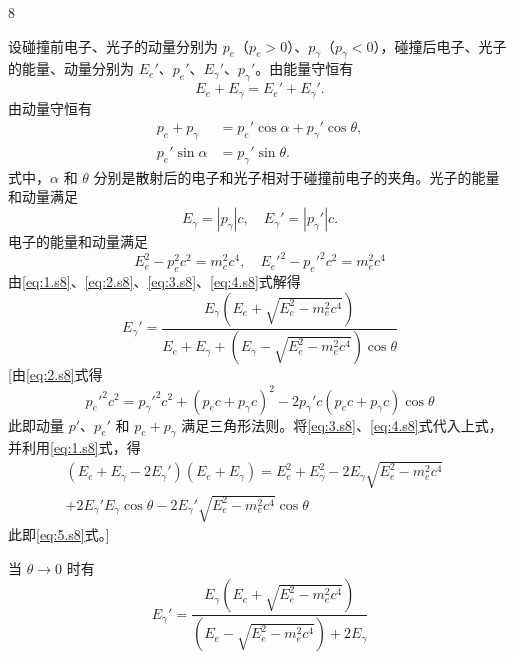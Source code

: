 \begin{solution}{8}
\begin{subsolution}
设碰撞前电子、光子的动量分别为 $p_e$（$p_e > 0$）、$p_\gamma$（$p_\gamma < 0$），碰撞后电子、光子的能量、动量分别为 $E_e'$、$p_e'$、$E_\gamma'$、$p_\gamma'$。由能量守恒有
\begin{equation}
E_e + E_\gamma = E_e' + E_\gamma'.
\label{eq:1.s8}
\end{equation}
由动量守恒有
\begin{equation}
\begin{aligned}
p_e + p_\gamma &= p_e' \cos \alpha + p_\gamma' \cos \theta, \nonumber\\
p_e' \sin \alpha &= p_\gamma' \sin \theta . 
\end{aligned}
\tag{1.8.2.s}
\label{eq:2.s8}
\end{equation}
式中，$\alpha$ 和 $\theta$ 分别是散射后的电子和光子相对于碰撞前电子的夹角。光子的能量和动量满足
\begin{equation}
E_\gamma = |p_\gamma| c, \quad E_\gamma' = |p_\gamma'| c.
\label{eq:3.s8}
\end{equation}
电子的能量和动量满足
\begin{equation}
E_e^2 - p_e^2 c^2 = m_e^2 c^4, \quad E_e'^2 - p_e'^2 c^2 = m_e^2 c^4
\label{eq:4.s8}
\end{equation}
由\eqref{eq:1.s8}、\eqref{eq:2.s8}、\eqref{eq:3.s8}、\eqref{eq:4.s8}式解得
\begin{equation}
E_\gamma' = \frac{E_\gamma \left(E_e + \sqrt{E_e^2 - m_e^2 c^4}\right)}{E_e + E_\gamma + \left(E_\gamma - \sqrt{E_e^2 - m_e^2 c^4}\right) \cos \theta}
\label{eq:5.s8}
\end{equation}
[由\eqref{eq:2.s8}式得
\begin{equation*}
p_e'^2 c^2 = p_\gamma'^2 c^2 + (p_e c + p_\gamma c)^2 - 2 p_\gamma' c (p_e c + p_\gamma c) \cos \theta
\end{equation*}
此即动量 $p'$、$p_e'$ 和 $p_e + p_\gamma$ 满足三角形法则。将\eqref{eq:3.s8}、\eqref{eq:4.s8}式代入上式，并利用\eqref{eq:1.s8}式，得
\begin{align*}
(E_e + E_\gamma - 2 E_\gamma')(E_e + E_\gamma) = E_e^2 + E_\gamma^2 - 2 E_\gamma \sqrt{E_e^2 - m_e^2 c^4} & \\
+ 2 E_\gamma' E_\gamma \cos \theta - 2 E_\gamma' \sqrt{E_e^2 - m_e^2 c^4} \cos \theta &
\end{align*}
此即\eqref{eq:5.s8}式。]

当 $\theta \to 0$ 时有
\begin{equation}
E_\gamma' = \frac{E_\gamma \left(E_e + \sqrt{E_e^2 - m_e^2 c^4}\right)}{\left(E_e - \sqrt{E_e^2 - m_e^2 c^4}\right) + 2 E_\gamma}
\label{eq:6.s8}
\end{equation}
\end{subsolution}


\end{solution}
